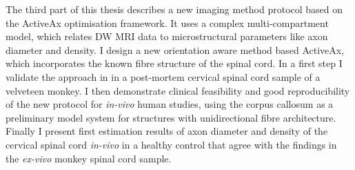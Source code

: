 {The third part of this thesis describes a new imaging method protocol based on the ActiveAx optimisation framework. It uses a complex multi-compartment model, which relates DW MRI data to microstructural parameters like axon diameter and density. I design a new orientation aware method based ActiveAx, which incorporates the known fibre structure of the spinal cord. In a first step I validate the approach in in a post-mortem cervical spinal cord sample of a velveteen monkey. I then demonstrate clinical feasibility and good reproducibility of the new protocol for \emph{in-vivo} human studies, using the corpus callosum as a preliminary model system for structures with unidirectional fibre architecture. Finally I present first estimation results of axon diameter and density of the cervical spinal cord \emph{in-vivo} in a healthy control that agree with the findings in the \emph{ex-vivo} monkey spinal cord sample.
\vfill
}
\endgroup			

